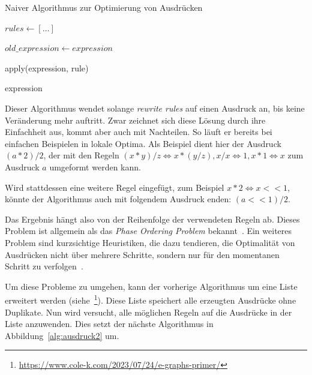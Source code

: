 \begin{algorithm}[H]
  \caption{Naiver Algorithmus zur Optimierung von Ausdrücken}\label{alg:ausdruck1}
  \begin{algorithmic}
    \State $rules \gets [\ldots]$
    
      \State $old\_expression \gets expression$

        \State apply(expression, rule)
        \EndIf
      \EndFor
    \EndWhile

    \State \Return expression
    \EndFunction
  \end{algorithmic}
\end{algorithm}





Dieser Algorithmus wendet solange \textit{rewrite rules} auf einen Ausdruck an, bis keine Veränderung mehr auftritt.
Zwar zeichnet sich diese Lösung durch ihre Einfachheit aus, kommt aber auch mit Nachteilen.
So läuft er bereits bei einfachen Beispielen in lokale Optima. 
Als Beispiel dient hier der Ausdruck $(a * 2) / 2$, der mit den Regeln $(x * y) / z \Leftrightarrow x * (y / z), x / x \Leftrightarrow 1, x * 1 \Leftrightarrow x$ 
zum Ausdruck $a$ umgeformt werden kann.


Wird stattdessen eine weitere Regel eingefügt, zum Beispiel $x * 2 \Leftrightarrow x << 1$, könnte der Algorithmus auch mit folgendem Ausdruck enden: $(a << 1) / 2$.

Das Ergebnis hängt also von der Reihenfolge der verwendeten Regeln ab. Dieses Problem ist allgemein als das \textit{Phase Ordering Problem} bekannt~\cite{phaseorder-2009}.
Ein weiteres Problem sind kurzsichtige Heuristiken, die dazu tendieren, die Optimalität von Ausdrücken nicht über mehrere Schritte, sondern nur für den momentanen Schritt
zu verfolgen~\cite{phaseorder-2009}.




\noindent Um diese Probleme zu umgehen, kann der vorherige Algorithmus um eine Liste erweitert werden (siehe~\footnote{\hspace{1.5mm}\url{https://www.cole-k.com/2023/07/24/e-graphs-primer/}}).
Diese Liste speichert alle erzeugten Ausdrücke ohne Duplikate. Nun wird versucht, alle möglichen Regeln auf die Ausdrücke in der Liste anzuwenden. 
Dies setzt der nächste Algorithmus in Abbildung~\ref{alg:ausdruck2} um.

